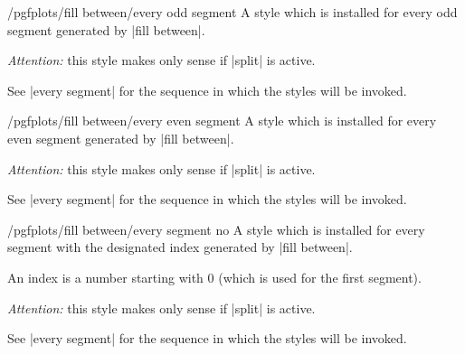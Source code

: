 \begin{stylekey}{/pgfplots/fill between/every odd segment}
	A style which is installed for every odd segment generated by |fill between|.

	\emph{Attention:} this style makes only sense if |split| is active.

	See |every segment| for the sequence in which the styles will be invoked.
\end{stylekey}

\begin{stylekey}{/pgfplots/fill between/every even segment}
	A style which is installed for every even segment generated by |fill between|.

	\emph{Attention:} this style makes only sense if |split| is active.

	See |every segment| for the sequence in which the styles will be invoked.
\end{stylekey}
\begin{stylekey}{/pgfplots/fill between/every segment no }
	A style which is installed for every segment with the designated index  generated by |fill between|.

	An index is a number starting with $0$ (which is used for the first segment).

	\emph{Attention:} this style makes only sense if |split| is active.

	See |every segment| for the sequence in which the styles will be invoked.
\end{stylekey}


